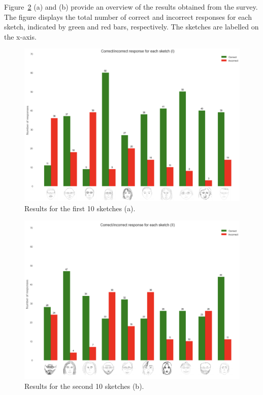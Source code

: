 \noindent Figure~\ref{fig:bar plot with correct/incorrect responses} (a) and (b) provide an overview of the results obtained from the survey. The figure displays the total number of correct and incorrect responses for each sketch, indicated by green and red bars, respectively. The sketches are labelled on the x-axis.

\begin{figure}[!b]
  \centering
  \includegraphics[width=1\textwidth]{figures/RISULTATI/correctIncorrectResponses-1.png}
  \caption{Results for the first \num{10} sketches (a).}
  \label{fig:bar plot with correct/incorrect responses}
\end{figure}

\begin{figure}[ht]
  \ContinuedFloat
  \centering
  \includegraphics[width=1\textwidth]{figures/RISULTATI/correctIncorrectResponses-2.png}
  \caption{Results for the second \num{10} sketches (b).}
  \label{fig:bar plot with correct/incorrect responses}
\end{figure}

